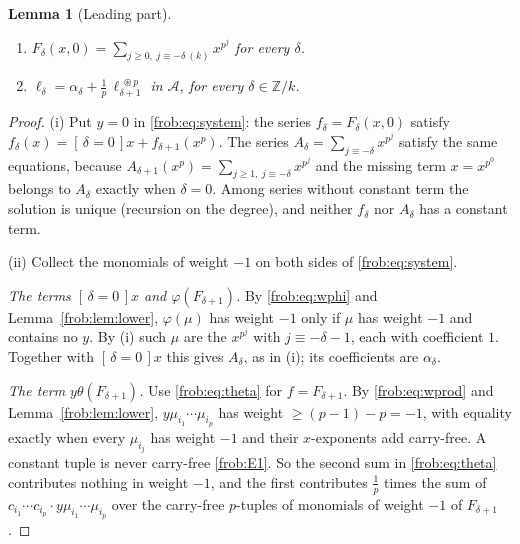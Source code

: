 \documentclass[11pt]{article}
\newtheorem{lemma}[theorem]{Lemma}
\theoremstyle{definition}
\theoremstyle{remark}
\numberwithin{equation}{section}
\numberwithin{figure}{section}
\newcommand{\Z}{\mathbb Z}
\newcommand{\A}{\mathcal A}
\newcommand{\cf}{\circledast}
\newcommand{\br}[1]{[\,#1\,]}
\begin{document}
\begin{lemma}[Leading part]\label{frob:lem:lead}
\begin{enumerate}[label=(\roman*)]
\item $F_\delta(x,0)=\sum_{j\ge0,\ j\equiv-\delta\ (k)}x^{p^j}$ for every $\delta$.
\item $\displaystyle \ell_\delta=\alpha_\delta+\frac1p\,\ell_{\delta+1}^{\;\cf p}$ in $\A$,
      for every $\delta\in\Z/k$.
\end{enumerate}
\end{lemma}

\begin{proof}
(i) Put $y=0$ in \eqref{frob:eq:system}: the series $f_\delta=F_\delta(x,0)$ satisfy
$f_\delta(x)=\br{\delta=0}x+f_{\delta+1}(x^p)$. The series
$A_\delta=\sum_{j\equiv-\delta}x^{p^j}$ satisfy the same equations, because
$A_{\delta+1}(x^p)=\sum_{j\ge1,\ j\equiv-\delta}x^{p^{j}}$ and the missing term $x=x^{p^0}$
belongs to $A_\delta$ exactly when $\delta=0$. Among series without constant term the solution
is unique (recursion on the degree), and neither $f_\delta$ nor $A_\delta$ has a constant term.

(ii) Collect the monomials of weight $-1$ on both sides of \eqref{frob:eq:system}.

\emph{The terms $\br{\delta=0}x$ and $\varphi(F_{\delta+1})$.} By \eqref{frob:eq:wphi} and
Lemma~\ref{frob:lem:lower}, $\varphi(\mu)$ has weight $-1$ only if $\mu$ has weight $-1$ and
contains no $y$. By (i) such $\mu$ are the $x^{p^j}$ with $j\equiv-\delta-1$, each with
coefficient $1$. Together with $\br{\delta=0}x$ this gives $A_\delta$, as in (i); its
coefficients are $\alpha_\delta$.

\emph{The term $y\theta(F_{\delta+1})$.} Use \eqref{frob:eq:theta} for $f=F_{\delta+1}$. By
\eqref{frob:eq:wprod} and Lemma~\ref{frob:lem:lower}, $y\mu_{i_1}\cdots\mu_{i_p}$ has weight
$\ge(p-1)-p=-1$, with equality exactly when every $\mu_{i_j}$ has weight $-1$ and their
$x$-exponents add carry-free. A constant tuple is never carry-free \ref{frob:E1}. So the second sum
in \eqref{frob:eq:theta} contributes nothing in weight $-1$, and the first contributes
$\frac1p$ times the sum of $c_{i_1}\cdots c_{i_p}\cdot y\mu_{i_1}\cdots\mu_{i_p}$ over the
carry-free $p$-tuples of monomials of weight $-1$ of $F_{\delta+1}$.


\end{proof}
\end{document}
